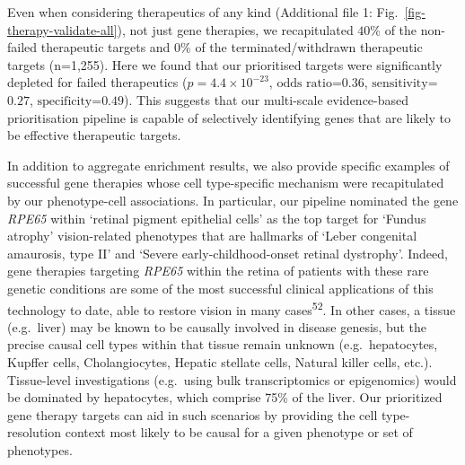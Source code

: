 \documentclass[
]{article}
\begin{document}
Even when considering therapeutics of any kind (Additional file 1:
Fig.~\ref{fig-therapy-validate-all}), not just gene therapies, we
recapitulated \(40\)\% of the non-failed therapeutic targets and 0\% of
the terminated/withdrawn therapeutic targets (n=1,255). Here we found
that our prioritised targets were significantly depleted for failed
therapeutics (\(p=\)\(4.4 \times 10^{-23}\),
\(\text{odds ratio=}\)\(0.36\), \(\text{sensitivity}\)=\(0.27\),
\(\text{specificity}\)=\(0.49\)). This suggests that our multi-scale
evidence-based prioritisation pipeline is capable of selectively
identifying genes that are likely to be effective therapeutic targets.

In addition to aggregate enrichment results, we also provide specific
examples of successful gene therapies whose cell type-specific mechanism
were recapitulated by our phenotype-cell associations. In particular,
our pipeline nominated the gene \emph{RPE65} within `retinal pigment
epithelial cells' as the top target for `Fundus atrophy' vision-related
phenotypes that are hallmarks of `Leber congenital amaurosis, type II'
and `Severe early-childhood-onset retinal dystrophy'. Indeed, gene
therapies targeting \emph{RPE65} within the retina of patients with
these rare genetic conditions are some of the most successful clinical
applications of this technology to date, able to restore vision in many
cases\textsuperscript{52}. In other cases, a tissue (e.g.~liver) may be
known to be causally involved in disease genesis, but the precise causal
cell types within that tissue remain unknown (e.g.~hepatocytes, Kupffer
cells, Cholangiocytes, Hepatic stellate cells, Natural killer cells,
etc.). Tissue-level investigations (e.g.~using bulk transcriptomics or
epigenomics) would be dominated by hepatocytes, which comprise 75\% of
the liver. Our prioritized gene therapy targets can aid in such
scenarios by providing the cell type-resolution context most likely to
be causal for a given phenotype or set of phenotypes.
\end{document}
